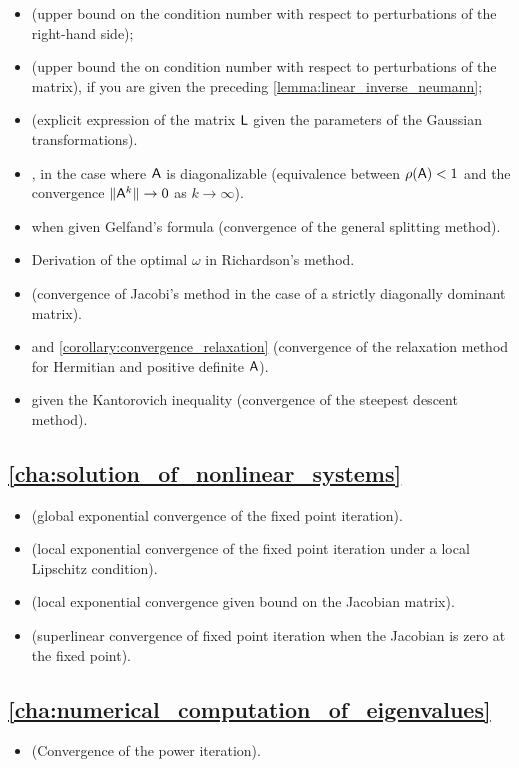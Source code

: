 \begin{itemize}
    \item {} (upper bound on the condition number with respect to perturbations of the right-hand side);
    \item {} (upper bound the on condition number with respect to perturbations of the matrix),
        if you are given the preceding \cref{lemma:linear_inverse_neumann};
    \item {} (explicit expression of the matrix $\mathsf L$ given the parameters of the Gaussian transformations).
    \item {},
        in the case where $\mathsf A$ is diagonalizable (equivalence between $\rho(\mathsf A) < 1$ and the convergence $\lVert\mathsf A^k\rVert \to 0$ as $k \to \infty$).

    \item {} when given Gelfand's formula (convergence of the general splitting method).
    \item Derivation of the optimal $\omega$ in Richardson's method.
    \item {} (convergence of Jacobi's method in the case of a strictly diagonally dominant matrix).
    \item {} and \cref{corollary:convergence_relaxation} (convergence of the relaxation method for Hermitian and positive definite $\mathsf A$).
    \item {} given the Kantorovich inequality (convergence of the steepest descent method).
\end{itemize}

\subsection*{\cref{cha:solution_of_nonlinear_systems}}%

\begin{itemize}
    \item {} (global exponential convergence of the fixed point iteration).
    \item {} (local exponential convergence of the fixed point iteration under a local Lipschitz condition).
    \item {}  (local exponential convergence given bound on the Jacobian matrix).
    \item {} (superlinear convergence of fixed point iteration when the Jacobian is zero at the fixed point).
\end{itemize}


\subsection*{\cref{cha:numerical_computation_of_eigenvalues}}%

\begin{itemize}
    \item {} (Convergence of the power iteration).
\end{itemize}

